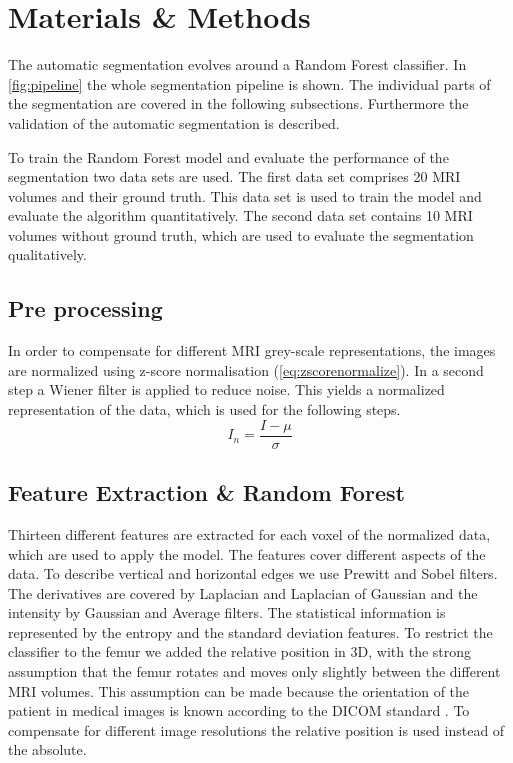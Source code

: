\section{Materials \& Methods}
The automatic segmentation evolves around a Random Forest classifier. In \autoref{fig:pipeline} the whole segmentation pipeline is shown. The individual parts of the segmentation are covered in the following subsections. Furthermore the validation of the automatic segmentation is described.

To train the Random Forest model and evaluate the performance of the segmentation two data sets are used. The first data set comprises 20 MRI volumes and their ground truth. This data set is used to train the model and evaluate the algorithm quantitatively. The second data set contains 10 MRI volumes without ground truth, which are used to evaluate the segmentation qualitatively.
\subsection{Pre processing}
In order to compensate for different MRI grey-scale representations, the images are normalized using z-score normalisation (\autoref{eq:zscorenormalize}). In a second step a Wiener filter is applied to reduce noise. This yields a normalized representation of the data, which is used for the following steps.
\begin{equation}
I_n = \frac{I - \mu}{\sigma}
\label{eq:zscorenormalize}
\end{equation}
\subsection{Feature Extraction \& Random Forest}
Thirteen different features are extracted for each voxel of the normalized data, which are used to apply the model. The features cover different aspects of the data. To describe vertical and horizontal edges we use Prewitt and Sobel filters. The derivatives are covered by Laplacian and Laplacian of Gaussian and the intensity by Gaussian and Average filters. The statistical information is represented by the entropy and the standard deviation features. To restrict the classifier to the femur we added the relative position in 3D, with the strong assumption that the femur rotates and moves only slightly between the different MRI volumes. This assumption can be made because the orientation of the patient in medical images is known according to the DICOM standard \cite{dicom-orientation}. To compensate for different image resolutions the relative position is used instead of the absolute.


